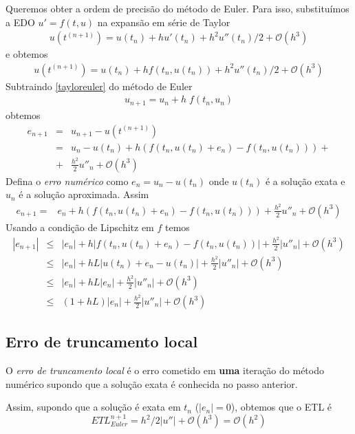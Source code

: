 Queremos obter a ordem de precisão do método de Euler. Para isso, substituímos a EDO $u'=f(t,u)$ na expansão em série de Taylor
\begin{eqnarray}\label{taylor}
   u(t^{(n+1)})=u(t_n)+hu'(t_n)+h^2u''(t_n)/2+ \mathcal O(h^3)
\end{eqnarray}
e obtemos
\begin{eqnarray}\label{tayloreuler}
 u(t^{(n+1)})=u(t_n)+hf(t_n,u(t_n))+h^2u''(t_n)/2+ \mathcal O(h^3)
\end{eqnarray}
Subtraindo \eqref{tayloreuler} do método de Euler
\begin{eqnarray}
    u_{n+1}=u_n + h\;f(t_n,u_n)
\end{eqnarray}
obtemos
\begin{eqnarray}
   e_{n+1}   &=& u_{n+1}-u(t^{(n+1)}) \\
             &=&u_n - u(t_n)  +h(f(t_n,u(t_n)+e_n)- f(t_n,u(t_n))) +\\
             &+&\frac{h^2}{2}u''_n+\mathcal O(h^3)
\end{eqnarray}
Defina o \emph{erro numérico} como $e_n=u_n-u(t_n)$ onde $u(t_n)$ é a solução exata e $u_n$ é a solução aproximada. Assim
\begin{eqnarray}
   e_{n+1}    =&e_n + h(f(t_n,u(t_n)+e_n)- f(t_n,u(t_n))) +\frac{h^2}{2}u''_n+\mathcal O(h^3)
\end{eqnarray}
Usando a condição de Lipschitz em $f$  temos
\begin{eqnarray}
   |e_{n+1}|      &\le &  |e_n| + h|f(t_n,u(t_n)+e_n)- f(t_n,u(t_n))|+\frac{h^2}{2}|u''_n|+\mathcal O(h^3)\\
                  &\le &  |e_n| + hL |u(t_n)+e_n- u(t_n)|+\frac{h^2}{2}|u''_n|+\mathcal O(h^3)\\
                  &\le &  |e_n| + hL |e_n|+\frac{h^2}{2}|u''_n|+\mathcal O(h^3)\\
                  &\le &  (1+ hL) |e_n|+\frac{h^2}{2}|u''_n|+\mathcal O(h^3)
\end{eqnarray}

\subsection{Erro de truncamento local}

O \emph{erro de truncamento local} é o erro cometido em \textbf{uma} iteração do método numérico supondo que a solução exata é conhecida no passo anterior.

Assim, supondo que a solução é exata em $t_n$ ($|e_n|=0$), obtemos que o ETL é
$$ETL_{Euler}^{n+1}= h^2/2|u''|+ \mathcal O(h^3) = \mathcal O(h^2)$$

